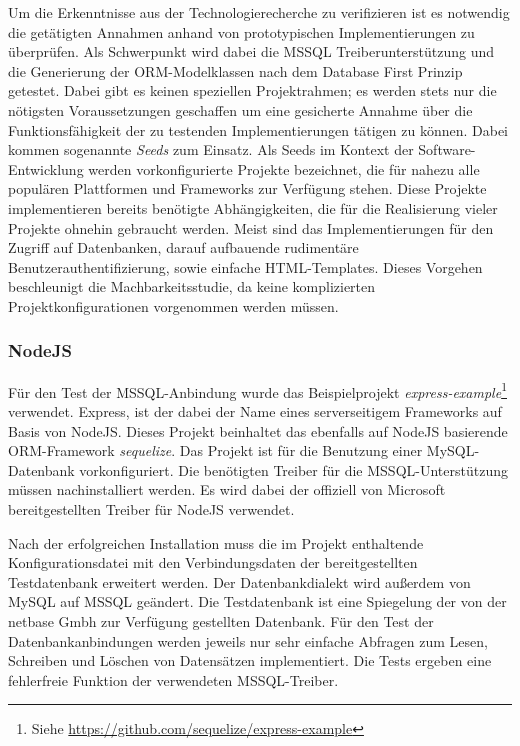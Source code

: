 Um die Erkenntnisse aus der Technologierecherche zu verifizieren ist es notwendig die getätigten Annahmen anhand von prototypischen Implementierungen zu überprüfen. Als Schwerpunkt wird dabei die MSSQL Treiberunterstützung und die Generierung der ORM-Modelklassen nach dem Database First Prinzip getestet. Dabei gibt es keinen speziellen Projektrahmen; es werden stets nur die nötigsten Voraussetzungen geschaffen um eine gesicherte Annahme über die Funktionsfähigkeit der zu testenden Implementierungen tätigen zu können. Dabei kommen sogenannte \emph{Seeds} zum Einsatz. Als Seeds im Kontext der Software-Entwicklung werden vorkonfigurierte Projekte bezeichnet, die für nahezu alle populären Plattformen und Frameworks zur Verfügung stehen. Diese Projekte implementieren bereits benötigte Abhängigkeiten, die für die Realisierung vieler Projekte ohnehin gebraucht werden. Meist sind das Implementierungen für den Zugriff auf Datenbanken, darauf aufbauende rudimentäre Benutzerauthentifizierung, sowie einfache HTML-Templates. Dieses Vorgehen beschleunigt die Machbarkeitsstudie, da keine komplizierten Projektkonfigurationen vorgenommen werden müssen.

\subsubsection{NodeJS}

Für den Test der MSSQL-Anbindung wurde das Beispielprojekt \emph{express-example}\footnote{Siehe \hyperlink{https://github.com/sequelize/express-example}{https://github.com/sequelize/express-example}} verwendet. Express, ist der dabei der Name eines serverseitigem Frameworks auf Basis von NodeJS. Dieses Projekt beinhaltet das ebenfalls auf NodeJS basierende ORM-Framework \emph{sequelize}. Das Projekt ist für die Benutzung einer MySQL-Datenbank vorkonfiguriert. Die benötigten Treiber für die MSSQL-Unterstützung müssen nachinstalliert werden. Es wird dabei der offiziell von Microsoft bereitgestellten Treiber für NodeJS verwendet.

Nach der erfolgreichen Installation muss die im Projekt enthaltende Konfigurationsdatei mit den Verbindungsdaten der bereitgestellten Testdatenbank erweitert werden. Der Datenbankdialekt wird außerdem von MySQL auf MSSQL geändert. Die Testdatenbank ist eine Spiegelung der von der netbase Gmbh zur Verfügung gestellten Datenbank. Für den Test der Datenbankanbindungen werden jeweils nur sehr einfache Abfragen zum Lesen, Schreiben und Löschen von Datensätzen implementiert. Die Tests ergeben eine fehlerfreie Funktion der verwendeten MSSQL-Treiber.

